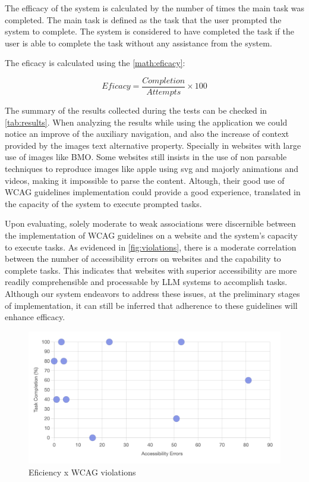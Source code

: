 \documentclass[conference]{IEEEtran}
\begin{document}
The efficacy of the system is calculated by the number of times the main task was completed. The main task is defined as the task that the user prompted the system to complete. The system is considered to have completed the task if the user is able to complete the task without any assistance from the system.

The eficacy is calculated using the \autoref{math:eficacy}:

\begin{equation}
    \label{math:eficacy}
    Eficacy = \frac{Completion}{Attempts}\times 100
\end{equation}

The summary of the results collected during the tests can be checked in \autoref{tab:results}. When analyzing the results while using the application we could notice an improve of the auxiliary navigation, and also the increase of context provided by the images text alternative property. Specially in websites with large use of images like BMO. Some websites still insists in the use of non parsable techniques to reproduce images like apple using svg and majorly animations and videos, making it impossible to parse the content. Altough, their good use of WCAG guidelines implementation could provide a good experience, translated in the capacity of the system to execute prompted tasks.

Upon evaluating, solely moderate to weak associations were discernible between the implementation of WCAG guidelines on a website and the system's capacity to execute tasks. As evidenced in \autoref{fig:violations}, there is a moderate correlation between the number of accessibility errors on websites and the capability to complete tasks. This indicates that websites with superior accessibility are more readily comprehensible and processable by LLM systems to accomplish tasks. Although our system endeavors to address these issues, at the preliminary stages of implementation, it can still be inferred that adherence to these guidelines will enhance efficacy.

\begin{figure}[h]
    \centering
    \includegraphics[width=1\linewidth]{images/eficiencexerrors.png}
    \caption{Eficiency x WCAG violations}
    \label{fig:violations}
\end{figure}
\end{document}
